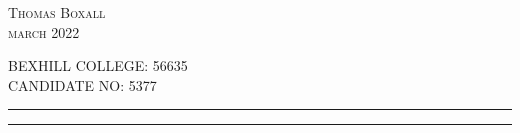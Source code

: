 \begin{titlepage}
	{\Large \textsc{Thomas Boxall}} \\%
	{\large\textsc{march 2022}} %
	
	\vfill %
	
	
	{\large\textsc{BEXHILL COLLEGE: 56635}} \\
	{\large\textsc{CANDIDATE NO: 5377}}
	
	\vspace{0.1\textheight} %
	
	
	\rule{\textwidth}{0.4pt} %
	
	\vspace{2pt}\vspace{-\baselineskip} %
	
	\rule{\textwidth}{1pt} %
	
\end{titlepage}